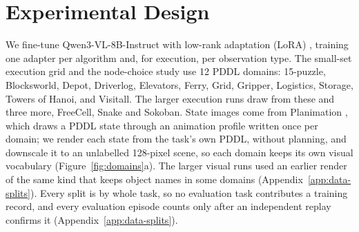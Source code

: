 \section{Experimental Design}
\label{sec:design}

We fine-tune Qwen3-VL-8B-Instruct \citep{bai2025qwen3vl} with low-rank adaptation (LoRA) \citep{hu2022lora}, training one adapter per algorithm and, for execution, per observation type. The small-set execution grid and the node-choice study use 12 PDDL domains: 15-puzzle, Blocksworld, Depot, Driverlog, Elevators, Ferry, Grid, Gripper, Logistics, Storage, Towers of Hanoi, and Visitall. The larger execution runs draw from these and three more, FreeCell, Snake and Sokoban. State images come from Planimation \citep{chen2020planimation}, which draws a PDDL state through an animation profile written once per domain; we render each state from the task's own PDDL, without planning, and downscale it to an unlabelled 128-pixel scene, so each domain keeps its own visual vocabulary (Figure~\ref{fig:domains}a). The larger visual runs used an earlier render of the same kind that keeps object names in some domains (Appendix~\ref{app:data-splits}). Every split is by whole task, so no evaluation task contributes a training record, and every evaluation episode counts only after an independent replay confirms it (Appendix~\ref{app:data-splits}).

